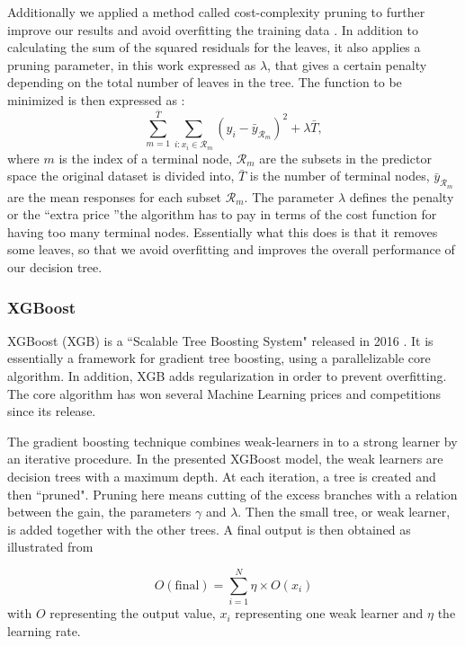 \documentclass[numberedappendix, twocolappendix]{emulateapj}
\begin{document}
Additionally we applied a method called cost-complexity pruning to further improve our results and avoid overfitting the training data \cite{Morten}. In addition to calculating the sum of the squared residuals for the leaves, it also applies a pruning parameter, in this work expressed as $\lambda$, that gives a certain penalty depending on the total number of leaves in the tree. The function to be minimized is then expressed as \cite{Morten}:
\begin{equation}
    \sum_{m=1}^{\bar{T}}\sum_{i:x_i\in \mathcal{R}_m}(y_i-\bar{y}_{\mathcal{R}_m})^2+\lambda \bar{T},
\end{equation}
where $m$ is the index of a terminal node, $\mathcal{R}_m$ are the subsets in the predictor space the original dataset is divided into, $\bar{T}$ is the number of terminal nodes, $\bar{y}_{\mathcal{R}_m}$ are the mean responses for each subset $\mathcal{R}_m$. The parameter $\lambda$ defines the penalty or the \textquotedblleft extra price \textquotedblright the algorithm has to pay in terms of the cost function for having too many terminal nodes. Essentially what this does is that it removes some leaves, so that we avoid overfitting and improves the overall performance of our decision tree.


\subsubsection{XGBoost}\label{sec: XGBoost}

XGBoost (XGB) is a ``Scalable Tree Boosting System"  released in 2016 \cite{xgboost}. It is essentially a framework for gradient tree boosting, using a parallelizable core algorithm. In addition, XGB adds regularization in order to prevent overfitting. The core algorithm has won several Machine Learning prices and competitions since its release.

The gradient boosting technique combines weak-learners in to a strong learner by an iterative procedure. In the presented XGBoost model, the weak learners are decision trees with a maximum depth. At each iteration, a tree is created and then ``pruned". Pruning here means cutting of the excess branches with a relation between the gain, the parameters $\gamma$ and $\lambda$. Then the small tree, or weak learner, is added together with the other trees. A final output is then obtained as illustrated from

\begin{equation}
    O(\mathrm{final}) = \sum_{i=1}^N\eta \times O(x_i)
\end{equation}
with $O$ representing the output value, $x_i$ representing one weak learner and $\eta$ the learning rate.
\end{document}
